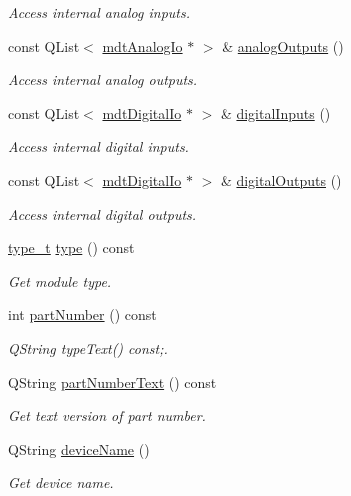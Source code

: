 \begin{DoxyCompactItemize}
\begin{DoxyCompactList}\small\item\em Access internal analog inputs. \end{DoxyCompactList}\item 
const Q\-List$<$ \hyperlink{classmdt_analog_io}{mdt\-Analog\-Io} $\ast$ $>$ \& \hyperlink{classmdt_device_modbus_wago_module_a61ed3d50d5ad17324a6bf9d7c2cd1df5}{analog\-Outputs} ()
\begin{DoxyCompactList}\small\item\em Access internal analog outputs. \end{DoxyCompactList}\item 
const Q\-List$<$ \hyperlink{classmdt_digital_io}{mdt\-Digital\-Io} $\ast$ $>$ \& \hyperlink{classmdt_device_modbus_wago_module_ad9f9289c7f23f00c6d4d25b576a5c440}{digital\-Inputs} ()
\begin{DoxyCompactList}\small\item\em Access internal digital inputs. \end{DoxyCompactList}\item 
const Q\-List$<$ \hyperlink{classmdt_digital_io}{mdt\-Digital\-Io} $\ast$ $>$ \& \hyperlink{classmdt_device_modbus_wago_module_a9d249d400b5e7f54e8fa7e0cc370eda2}{digital\-Outputs} ()
\begin{DoxyCompactList}\small\item\em Access internal digital outputs. \end{DoxyCompactList}\item 
\hyperlink{classmdt_device_modbus_wago_module_a2d8f6895b2a031c953bd91c2f65a1a25}{type\-\_\-t} \hyperlink{classmdt_device_modbus_wago_module_a32a3ee554941240682fb1b166c1217ff}{type} () const 
\begin{DoxyCompactList}\small\item\em Get module type. \end{DoxyCompactList}\item 
int \hyperlink{classmdt_device_modbus_wago_module_ab694800ebccf308beb9eeb9a789b0442}{part\-Number} () const 
\begin{DoxyCompactList}\small\item\em Q\-String type\-Text() const;. \end{DoxyCompactList}\item 
Q\-String \hyperlink{classmdt_device_modbus_wago_module_acac6ca0c286f50adbd62d055339131f9}{part\-Number\-Text} () const 
\begin{DoxyCompactList}\small\item\em Get text version of part number. \end{DoxyCompactList}\item 
Q\-String \hyperlink{classmdt_device_modbus_wago_module_ac67ae134628f958027965933d14cb30b}{device\-Name} ()
\begin{DoxyCompactList}\small\item\em Get device name. \end{DoxyCompactList}\end{DoxyCompactItemize}
